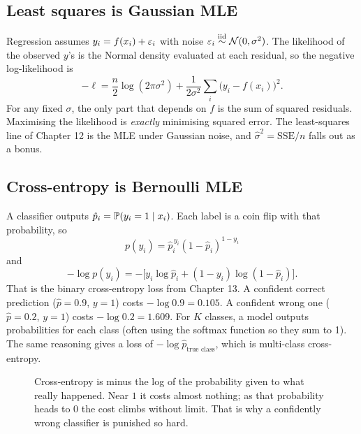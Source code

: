 \subsection{Least squares is Gaussian MLE}

Regression assumes $y_i = f(x_i) + \varepsilon_i$ with noise $\varepsilon_i\overset{\text{iid}}{\sim}\mathcal{N}(0,\sigma^2)$.
The likelihood of the observed $y$'s is the Normal density evaluated at each residual,
so the negative log-likelihood is
\[
  -\ell = \frac n2\log(2\pi\sigma^2) + \frac{1}{2\sigma^2}\sum_i \big(y_i - f(x_i)\big)^2 .
\]
For any fixed $\sigma$, the only part that depends on $f$ is the sum of squared
residuals. Maximising the likelihood is \emph{exactly} minimising squared error. The
least-squares line of Chapter 12 is the MLE under Gaussian noise, and
$\hat\sigma^2 = \text{SSE}/n$ falls out as a bonus.

\subsection{Cross-entropy is Bernoulli MLE}

A classifier outputs $\hat p_i = \operatorname{\mathbb{P}}(y_i=1\mid x_i)$. Each label is a coin flip with
that probability, so
\[
  p(y_i) = \hat p_i^{\,y_i}(1-\hat p_i)^{1-y_i}
\]
and
\[
  -\log p(y_i) = -\big[y_i\log\hat p_i + (1-y_i)\log(1-\hat p_i)\big].
\]
That is the binary cross-entropy loss from Chapter 13. A confident correct prediction
($\hat p=0.9$, $y=1$) costs $-\log 0.9 = 0.105$. A confident wrong one ($\hat p = 0.2$,
$y=1$) costs $-\log 0.2 = 1.609$. For $K$ classes, a model outputs probabilities for each class (often using the softmax function so they sum to 1). The same reasoning gives a loss of $-\log \hat p_{\text{true class}}$, which is multi-class cross-entropy.

\begin{figure}[H]
\centering
{}
\caption{Cross-entropy is minus the log of the probability given to what really happened.
Near $1$ it costs almost nothing; as that probability heads to $0$ the cost climbs without
limit. That is why a confidently wrong classifier is punished so hard.}
\label{fig:lik-cross-entropy}
\end{figure}

